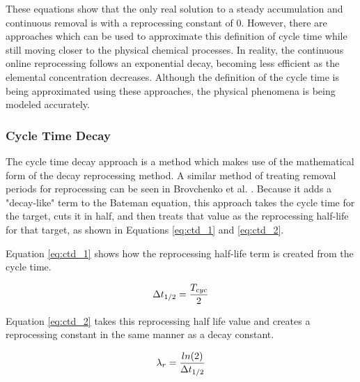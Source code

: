  These equations show that the only real solution to a steady accumulation and continuous removal is with a reprocessing constant of 0. However, there are approaches which can be used to approximate this definition of cycle time while still moving closer to the physical chemical processes. In reality, the continuous online reprocessing follows an exponential decay, becoming less efficient as the elemental concentration decreases. Although the definition of the cycle time is being approximated using these approaches, the physical phenomena is being modeled accurately.

\subsubsection{Cycle Time Decay}
\label{s:CTD}

The cycle time decay approach is a method which makes use of the mathematical form of the decay reprocessing method. A similar method of treating removal periods for reprocessing can be seen in Brovchenko et al. \cite{brovchenko_neutronic_2019}. Because it adds a "decay-like" term to the Bateman equation, this approach takes the cycle time for the target, cuts it in half, and then treats that value as the reprocessing half-life for that target, as shown in  Equations \eqref{eq:ctd_1} and \eqref{eq:ctd_2}.

Equation \eqref{eq:ctd_1} shows how the reprocessing half-life term is created from the cycle time.

\begin{equation} \hfill
\Delta t_{1/2} = \frac{T_{cyc}}{2}
\hfill\label{eq:ctd_1} \end{equation}

Equation \eqref{eq:ctd_2} takes this reprocessing half life value and creates a reprocessing constant in the same manner as a decay constant.

\begin{equation} \hfill
\lambda_r = \frac{ln(2)}{\Delta t_{1/2}}
\hfill\label{eq:ctd_2} \end{equation}



